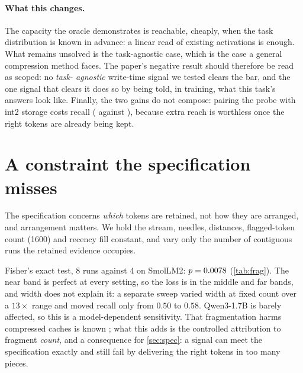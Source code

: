 \documentclass[10pt]{article}
\begin{document}
\paragraph{What this changes.} The capacity the oracle demonstrates is
reachable, cheaply, when the task distribution is known in advance: a linear
read of existing activations is enough. What remains unsolved is the
task-agnostic case, which is the case a general compression method faces. The
paper's negative result should therefore be read as scoped: no \emph{task-%
agnostic} write-time signal we tested clears the bar, and the one signal that
clears it does so by being told, in training, what this task's answers look
like. Finally, the two gains do not compose: pairing the probe with int2
storage costs recall (\ProbeIntTwoESmall{} against \ProbeESmall), because
extra reach is worthless once the right tokens are already being kept.

\section{A constraint the specification misses}\label{sec:frag}

The specification concerns \emph{which} tokens are retained, not how they are
arranged, and arrangement matters. We hold the stream, needles, distances,
flagged-token count (1600) and recency fill constant, and vary only the number
of contiguous runs the retained evidence occupies.

\begin{table}[ht]\centering\small
\caption{Fragmentation at fixed retention: recall against the number of
contiguous runs holding the same 1600 retained tokens, 24 queries per cell,
Wilson 95\% intervals. Stream, needles, distances and recency fill are held
constant; only the arrangement of the retained evidence varies.}
\label{tab:frag}
\TabFrag
\end{table}

Fisher's exact test, 8 runs against 4 on SmolLM2: $p = 0.0078$
(\cref{tab:frag}). The near band is perfect at every setting, so the loss
is in the middle and far bands, and width does not explain it: a separate
sweep varied width at fixed count over a $13\times$ range and moved recall only
from $0.50$ to $0.58$. Qwen3-1.7B is barely affected, so this is a
model-dependent sensitivity. That fragmentation harms compressed caches is
known \citep{yang2026ams}; what this adds is the controlled attribution to
fragment \emph{count}, and a consequence for \cref{sec:spec}: a signal can
meet the specification exactly and still fail by delivering the right tokens
in too many pieces.
\end{document}
